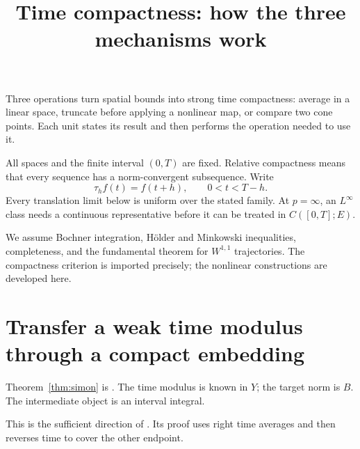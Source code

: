 \documentclass[12pt,reqno]{amsart}
\title{Time compactness: how the three mechanisms work}
\date{}
\begin{document}
\maketitle

Three operations turn spatial bounds into strong time compactness: average in a linear space, truncate before applying a nonlinear map, or compare two cone points. Each unit states its result and then performs the operation needed to use it.

All spaces and the finite interval $(0,T)$ are fixed. Relative compactness means that every sequence has a norm-convergent subsequence. Write
\[
\tau_h f(t)=f(t+h),\qquad 0<t<T-h.
\]
Every translation limit below is uniform over the stated family. At $p=\infty$, an $L^\infty$ class needs a continuous representative before it can be treated in $C([0,T];E)$.

We assume Bochner integration, H\"older and Minkowski inequalities, completeness, and the fundamental theorem for $W^{1,1}$ trajectories. The compactness criterion is imported precisely; the nonlinear constructions are developed here.

\section{Transfer a weak time modulus through a compact embedding}

\begin{theorem}[Simon]\label{thm:simon}

\end{theorem}

Theorem~\ref{thm:simon} is \cite[Theorem 5, pp.~84--85]{S-simon}. The time modulus is known in $Y$; the target norm is $B$. The intermediate object is an interval integral.

\begin{lemma}[Simon]\label{lem:criterion}

\end{lemma}

This is the sufficient direction of \cite[Theorem 1, pp.~71--73]{S-simon}. Its proof uses right time averages and then reverses time to cover the other endpoint.
\end{document}
